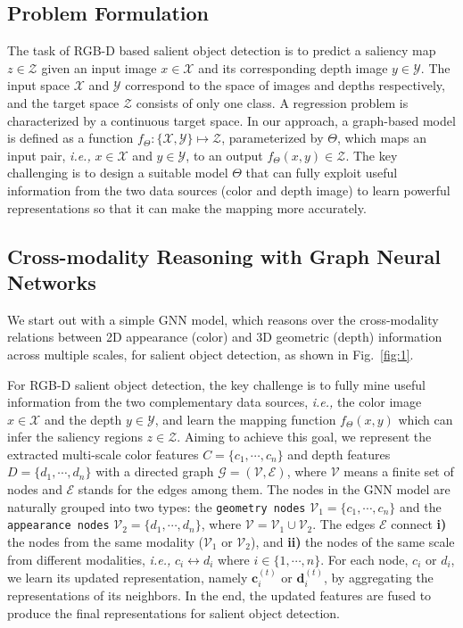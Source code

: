\documentclass[runningheads]{llncs}
\begin{document}
	\subsection{Problem Formulation}

The task of RGB-D based salient object detection is to predict a saliency map $z \in \mathcal{Z}$ given an input image $x \in \mathcal{X}$ and its corresponding depth image $y \in \mathcal{Y}$. The input space $\mathcal{X}$ and $\mathcal{Y}$ correspond to the space of images and depths respectively, and the target space $\mathcal{Z}$ consists of only one class.  A regression problem is characterized by a continuous target space. In our approach, a graph-based model is defined as a function $f_{\Theta} : \{\mathcal{X},  \mathcal{Y}\} \mapsto \mathcal{Z}$, parameterized by ${\Theta}$, which maps an input pair, \emph{i.e.,} $x \in \mathcal{X}$ and $y \in \mathcal{Y}$, to an output $f_{\Theta} (x,y) \in \mathcal{Z}$. The key challenging is to design a suitable model $\Theta$ that can fully exploit useful information from the two data sources (color and depth image) to learn powerful representations so that it can make the mapping more accurately. 

	\subsection{Cross-modality Reasoning with Graph Neural Networks}
		We start out with a simple GNN model, which reasons over the cross-modality relations between 2D appearance (color) and 3D geometric (depth) information across multiple scales, for salient object detection, as shown in Fig.~\ref{fig:1}.

		 For RGB-D salient object detection, the key challenge is to fully mine useful information from the two complementary data sources, \emph{i.e.,} the color image $x \in \mathcal{X}$ and the depth $y \in \mathcal{Y}$, and learn the mapping function $f_{\Theta}(x,y)$ which can infer the saliency regions $z \in \mathcal{Z}$. Aiming to achieve this goal, we represent the extracted multi-scale color features $C = \{c_1,\cdots, c_n\}$ and depth features $D = \{d_1,\cdots, d_n\}$ with a directed graph $\mathcal G = (\mathcal{V, E})$, where $\mathcal V$ means a finite set of nodes and $\mathcal E$ stands for the edges among them. The nodes in the GNN model are naturally grouped into two types: the {\tt geometry nodes} $\mathcal V_1 = \{c_1,\cdots,c_n\}$ and the {\tt appearance nodes} $\mathcal V_2 = \{d_1,\cdots, d_n\}$, where $\mathcal V = \mathcal V_1 \cup \mathcal V_2$. The edges $\mathcal{E}$ connect {\bfseries \small i)} the nodes from the same modality ($\mathcal V_1$ or $\mathcal V_2$), and {\bfseries \small ii)} the nodes of the same scale from different modalities, \emph{i.e.,} $c_i \leftrightarrow d_i$ where $i \in \{1,\cdots, n\}$. For each node, $c_i$ or $d_i$, we learn its updated representation, namely $\mathbf c_i^{(t)}$ or $\mathbf d_i^{(t)}$, by aggregating the representations of its neighbors. In the end, the updated features are fused to produce the final representations for salient object detection.
\end{document}
